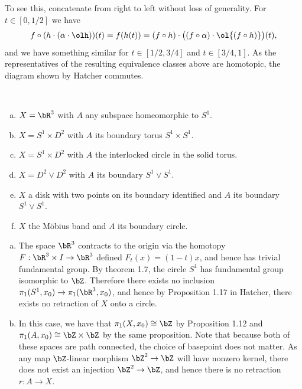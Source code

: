 \begin{homework}[e]
\begin{prf}
    To see this, concatenate from right to left without loss of generality. For $t \in [0,1/2]$ we have
    \begin{align*}
      f\circ (h\cdot (\alpha\cdot \olh))(t) = f(h(t)) = (f\circ h) \cdot \big((f\circ \alpha) \cdot \ol{(f\circ h)}\big)(t),
    \end{align*}
    and we have something similar for $t \in [1/2,3/4]$ and $t \in [3/4,1]$. As the representatives of the resulting equivalence classes above are homotopic, the diagram shown by Hatcher commutes.
\end{prf}

$ $
\begin{enumerate}[(a)]
  \item $X = \bR^3$ with $A$ any subspace homeomorphic to $S^1$.
  \item $X = S^1 \times D^2$ with $A$ its boundary torus $S^1\times S^1$.
  \item $X = S^1\times D^2$ with $A$ the interlocked circle in the solid torus.
  \item $X = D^2 \vee D^2$ with $A$ its boundary $S^1 \vee S^1$.
  \item $X$ a disk with two points on its boundary identified and $A$ its boundary $S^1 \vee S^1$.
  \item $X$ the M\"obius band and $A$ its boundary circle.
\end{enumerate}
\begin{prf}
  \begin{enumerate}[(a)]
    \item The space $\bR^3$ contracts to the origin via the homotopy $F:\bR^3 \times I \to \bR^3$ defined $F_t(x) = (1 - t)x$, and hence has trivial fundamental group. By theorem 1.7, the circle $S^1$ has fundamental group isomorphic to $\bZ$. Therefore there exists no inclusion $\pi_1(S^1,x_0) \to \pi_1(\bR^3,x_0)$, and hence by Proposition 1.17 in Hatcher, there exists no retraction of $X$ onto a circle.

    \item In this case, we have that $\pi_1(X,x_0) \cong \bZ$ by Proposition 1.12 and $\pi_1(A,x_0) \cong \bZ\times \bZ$ by the same proposition. Note that because both of these spaces are path connected, the choice of basepoint does not matter. As any map $\bZ$-linear morphism $\bZ^2 \to \bZ$ will have nonzero kernel, there does not exist an injection $\bZ^2 \to \bZ$, and hence there is no retraction $r:A\to X$.


\end{enumerate}
\end{prf}
\end{homework}
